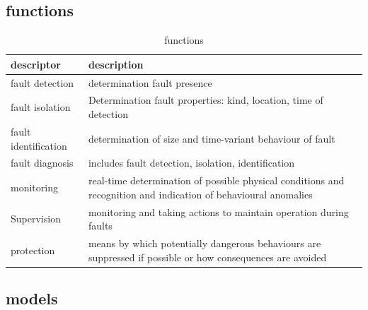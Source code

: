 \subsection{functions}
\label{chap:metadata_functions}
\begin{table}[!h]
    \centering
    \begin{tabular}{@{}ll@{}}
        \toprule
        descriptor           & description                                                                                                     \\ \midrule
        fault detection      & determination fault presence                                                                                    \\
        fault isolation      & Determination fault properties: kind, location, time of detection                                               \\
        fault identification & determination of size and time-variant behaviour of fault                                                       \\
        fault diagnosis      & includes fault detection, isolation, identification                                                             \\
        monitoring           & real-time determination of possible physical conditions and recognition and indication of behavioural anomalies \\
        Supervision          & monitoring and taking actions to maintain operation during faults                                               \\
        protection           & means by which potentially dangerous behaviours are suppressed if possible or how consequences are avoided      \\ \bottomrule
    \end{tabular}
    \caption{functions}
\end{table}

\subsection{models}
\label{chap:metadata_models}

